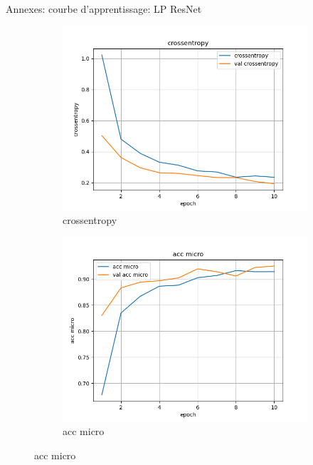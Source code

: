 \documentclass[11pt]{beamer}
\begin{document}
\begin{frame}{Annexes: courbe d'apprentissage: LP ResNet}
    \begin{figure}[ht]
        \centering
        \begin{subfigure}{0.32\textwidth}
            \centering
            \includegraphics[width=\linewidth]{../logs/resnet_img256_0/crossentropy.png}
            \caption{crossentropy}
        \end{subfigure}
        \begin{subfigure}{0.32\textwidth}
            \centering
            \includegraphics[width=\linewidth]{../logs/resnet_img256_0/acc micro.png}
            \caption{acc micro}
        \end{subfigure}

\end{figure}
\end{frame}
\end{document}
